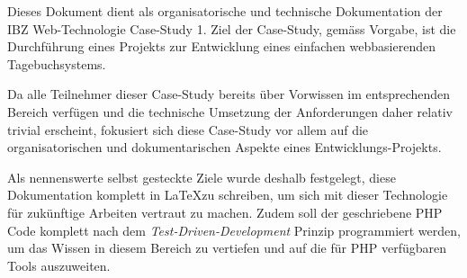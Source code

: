 \noindent
Dieses Dokument dient als organisatorische und technische Dokumentation der IBZ Web-Technologie Case-Study 1. Ziel der Case-Study, gemäss Vorgabe, ist die Durchführung eines Projekts zur Entwicklung eines einfachen webbasierenden Tagebuchsystems.

\vspace{5mm}
\noindent
Da alle Teilnehmer dieser Case-Study bereits über Vorwissen im entsprechenden Bereich verfügen und die technische Umsetzung der Anforderungen daher relativ trivial erscheint, fokusiert sich diese Case-Study vor allem auf die organisatorischen und dokumentarischen Aspekte eines Entwicklungs-Projekts.

\vspace{5mm}
\noindent
Als nennenswerte selbst gesteckte Ziele wurde deshalb festgelegt, diese Dokumentation komplett in \LaTeX zu schreiben, um sich mit dieser Technologie für zukünftige Arbeiten vertraut zu machen. Zudem soll der geschriebene PHP Code komplett nach dem \emph{Test-Driven-Development} Prinzip programmiert werden, um das Wissen in diesem Bereich zu vertiefen und auf die für PHP verfügbaren Tools auszuweiten.

